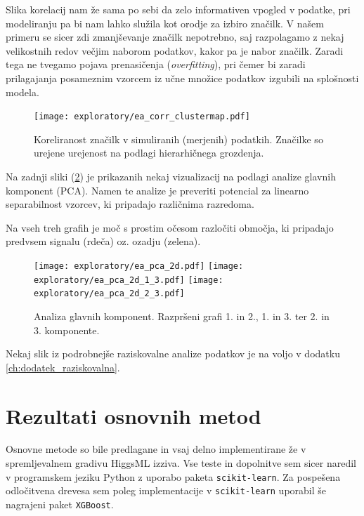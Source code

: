 \documentclass[11pt,a4paper,openany]{book}
\begin{document}
Slika korelacij nam že sama po sebi da zelo informativen vpogled v podatke, pri modeliranju pa bi nam lahko služila kot orodje za izbiro značilk. V našem primeru se sicer zdi zmanjševanje značilk nepotrebno, saj razpolagamo z nekaj velikostnih redov večjim naborom podatkov, kakor pa je nabor značilk. Zaradi tega ne tvegamo pojava prenasičenja (\textit{overfitting}), pri čemer bi zaradi prilagajanja posameznim vzorcem iz učne množice podatkov izgubili na splošnosti modela.

\begin{figure}[ht]
	\centering
	\texttt{[image: exploratory/ea\_corr\_clustermap.pdf]}
	\caption{Koreliranost značilk v simuliranih (merjenih) podatkih. Značilke so urejene urejenost na podlagi hierarhičnega grozdenja.}
	\label{sl:corr_clust_matrix}
\end{figure}

Na zadnji sliki (\ref{sl:pca}) je prikazanih nekaj vizualizacij na podlagi analize glavnih komponent (PCA). Namen te analize je preveriti potencial za linearno separabilnost vzorcev, ki pripadajo različnima razredoma. 


Na vseh treh grafih je moč s prostim očesom razločiti območja, ki pripadajo predvsem signalu (rdeča) oz. ozadju (zelena).

\begin{figure}[h]	
	\texttt{[image: exploratory/ea\_pca\_2d.pdf]}
	\texttt{[image: exploratory/ea\_pca\_2d\_1\_3.pdf]}
	\texttt{[image: exploratory/ea\_pca\_2d\_2\_3.pdf]}		
	
	\caption{Analiza glavnih komponent. Razpršeni grafi 1. in 2., 1. in 3. ter 2. in 3. komponente.}
	\label{sl:pca}
\end{figure}

Nekaj slik iz podrobnejše raziskovalne analize podatkov je na voljo v dodatku \ref{ch:dodatek_raziskovalna}.

	
\chapter{Rezultati osnovnih metod}

Osnovne metode so bile predlagane in vsaj delno implementirane že v spremljevalnem gradivu HiggsML izziva. Vse teste in dopolnitve sem sicer naredil v programskem jeziku Python z uporabo paketa \texttt{scikit-learn}\cite{scikit-learn}. Za pospešena odločitvena drevesa sem poleg implementacije v \texttt{scikit-learn} uporabil še nagrajeni paket \texttt{XGBoost}\cite{chen2014}.
\end{document}
